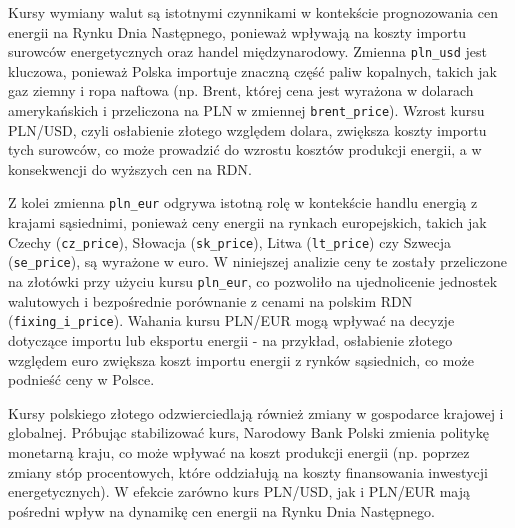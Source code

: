 Kursy wymiany walut są istotnymi czynnikami w kontekście prognozowania cen energii na Rynku Dnia Następnego, ponieważ wpływają na koszty importu surowców energetycznych oraz handel międzynarodowy. Zmienna \texttt{pln\_usd} jest kluczowa, ponieważ Polska importuje znaczną część paliw kopalnych, takich jak gaz ziemny i ropa naftowa (np. Brent, której cena jest wyrażona w dolarach amerykańskich i przeliczona na PLN w zmiennej \texttt{brent\_price}). Wzrost kursu PLN/USD, czyli osłabienie złotego względem dolara, zwiększa koszty importu tych surowców, co może prowadzić do wzrostu kosztów produkcji energii, a w konsekwencji do wyższych cen na RDN.

Z kolei zmienna \texttt{pln\_eur} odgrywa istotną rolę w kontekście handlu energią z krajami sąsiednimi, ponieważ ceny energii na rynkach europejskich, takich jak Czechy (\texttt{cz\_price}), Słowacja (\texttt{sk\_price}), Litwa (\texttt{lt\_price}) czy Szwecja (\texttt{se\_price}), są wyrażone w euro. W niniejszej analizie ceny te zostały przeliczone na złotówki przy użyciu kursu \texttt{pln\_eur}, co pozwoliło na ujednolicenie jednostek walutowych i bezpośrednie porównanie z cenami na polskim RDN (\texttt{fixing\_i\_price}). Wahania kursu PLN/EUR mogą wpływać na decyzje dotyczące importu lub eksportu energii - na przykład, osłabienie złotego względem euro zwiększa koszt importu energii z rynków sąsiednich, co może podnieść ceny w Polsce.

Kursy polskiego złotego odzwierciedlają również zmiany w gospodarce krajowej i globalnej. Próbując stabilizować kurs, Narodowy Bank Polski zmienia politykę monetarną kraju, co może wpływać na koszt produkcji energii (np. poprzez zmiany stóp procentowych, które oddziałują na koszty finansowania inwestycji energetycznych). W efekcie zarówno kurs PLN/USD, jak i PLN/EUR mają pośredni wpływ na dynamikę cen energii na Rynku Dnia Następnego.